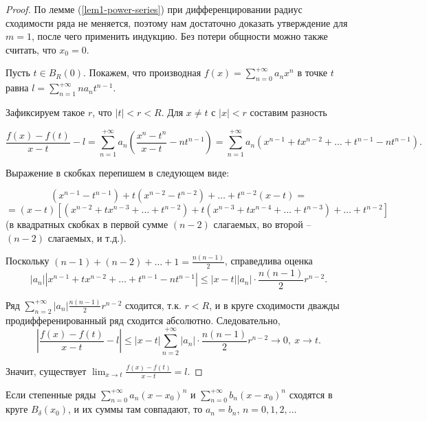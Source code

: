 \begin{proof}
    По лемме (\ref{lem1-power-series}) при дифференцировании радиус сходимости ряда не меняется, поэтому нам достаточно доказать утверждение для $m = 1$, после чего применить индукцию. Без потери общности можно также считать, что $x_{0} = 0$.

    Пусть $t \in B_{R}(0)$. Покажем, что производная $f(x) = \sum_{n = 0}^{+\infty}a_{n}x^{n}$ в точке $t$ равна $l = \sum_{n = 1}^{+\infty} n a_{n} t^{n - 1}$.

    Зафиксируем такое $r$, что $|t| < r < R$. Для $x \neq t$ с $|x| < r$ составим разность

    \[\frac{f(x) - f(t)}{x - t} - l = \sum_{n = 1}^{+\infty} a_{n} \left(\frac{x^{n} - t^{n}}{x - t} - n t^{n - 1}\right) = \sum_{n = 1}^{+\infty} a_{n} \left(x^{n - 1} + tx^{n - 2} + \ldots + t^{n - 1} - n t^{n - 1}\right).\]

    Выражение в скобках перепишем в следующем виде:

    \[(x^{n - 1} - t^{n - 1}) + t(x^{n - 2} - t^{n - 2}) + \ldots + t^{n - 2}(x - t) =\]
    \[= (x - t)\left[(x^{n - 2} + t x^{n - 3} + \ldots + t^{n - 2}) + t(x^{n - 3} + t x^{n - 4} + \ldots + t^{n - 3}) + \ldots + t^{n - 2}\right]\]
    (в квадратных скобках в первой сумме $(n - 2)$ слагаемых, во второй -- $(n - 2)$ слагаемых, и т.д.).

    Поскольку $(n - 1) + (n - 2) + \ldots + 1 = \frac{n(n - 1)}{2}$, справедлива оценка
    \[|a_{n}||x^{n - 1} + t x^{n - 2} + \ldots + t^{n - 1} - n t^{n - 1}| \leq |x - t||a_{n}|\cdot \frac{n(n - 1)}{2} r^{n - 2}.\]

    Ряд $\sum_{n = 2}^{+\infty} |a_{n}|\frac{n(n - 1)}{2} r^{n - 2}$ сходится, т.к. $r < R$, и в круге сходимости дважды продифференированный ряд сходится абсолютно. Следовательно,
    \[\left|\frac{f(x) - f(t)}{x - t} - l\right| \leq |x - t| \sum_{n = 2}^{+\infty}|a_{n}|\cdot \frac{n(n - 1)}{2} r^{n - 2} \to 0, \ x \to t.\]

    Значит, существует $\lim_{x \to t}\frac{f(x) - f(t)}{x - t} = l$.
\end{proof}

\begin{corollary}
    Если степенные ряды $\sum_{n = 0}^{+\infty} a_{n}(x - x_{0})^{n}$ и $\sum_{n = 0}^{+\infty} b_{n}(x - x_{0})^{n}$ сходятся в круге $B_{\delta}(x_{0})$, и их суммы там совпадают, то $a_{n} = b_{n}$, $n = 0, 1, 2, \ldots$
\end{corollary}

